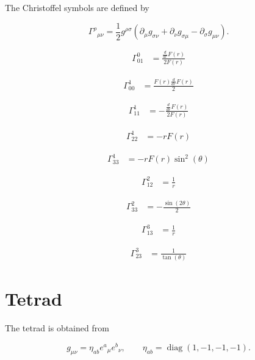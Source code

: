 \documentclass[12pt,fleqn]{article}
\begin{document}
The Christoffel symbols are defined by

\[
\Gamma^\rho{}_{\mu\nu}
=
\frac{1}{2}
g^{\rho\sigma}
\left(
\partial_\mu g_{\sigma\nu}
+
\partial_\nu g_{\sigma\mu}
-
\partial_\sigma g_{\mu\nu}
\right).
\]

\[
\begin{aligned}
\Gamma^{0}_{01} &= \frac{\frac{d}{d r} F{\left(r \right)}}{2 F{\left(r \right)}}
\end{aligned}
\]

\[
\begin{aligned}
\Gamma^{1}_{00} &= \frac{F{\left(r \right)} \frac{d}{d r} F{\left(r \right)}}{2}
\end{aligned}
\]

\[
\begin{aligned}
\Gamma^{1}_{11} &= - \frac{\frac{d}{d r} F{\left(r \right)}}{2 F{\left(r \right)}}
\end{aligned}
\]

\[
\begin{aligned}
\Gamma^{1}_{22} &= - r F{\left(r \right)}
\end{aligned}
\]

\[
\begin{aligned}
\Gamma^{1}_{33} &= - r F{\left(r \right)} \sin^{2}{\left(\theta \right)}
\end{aligned}
\]

\[
\begin{aligned}
\Gamma^{2}_{12} &= \frac{1}{r}
\end{aligned}
\]

\[
\begin{aligned}
\Gamma^{2}_{33} &= - \frac{\sin{\left(2 \theta \right)}}{2}
\end{aligned}
\]

\[
\begin{aligned}
\Gamma^{3}_{13} &= \frac{1}{r}
\end{aligned}
\]

\[
\begin{aligned}
\Gamma^{3}_{23} &= \frac{1}{\tan{\left(\theta \right)}}
\end{aligned}
\]

\section*{Tetrad}

The tetrad is obtained from

\[
g_{\mu\nu}
=
\eta_{ab}
e^a{}_\mu
e^b{}_\nu ,
\qquad
\eta_{ab}
=
\operatorname{diag}(1,-1,-1,-1).
\]
\end{document}
